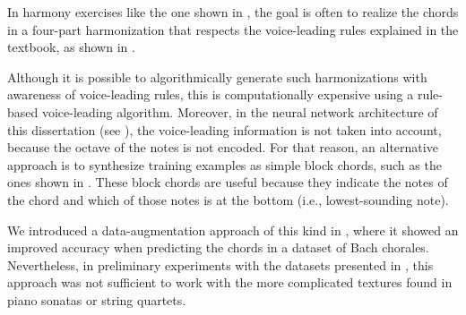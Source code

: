 
In harmony exercises like the one shown in
, the goal is often to
\gls{realize} the chords in a four-part harmonization that
respects the voice-leading rules explained in the textbook,
as shown in . 


Although it is possible to algorithmically generate such
harmonizations with awareness of voice-leading rules, this
is computationally expensive using a rule-based
voice-leading
algorithm.
Moreover, in the neural network architecture of this
dissertation (see ), the voice-leading
information is not taken into account, because the octave of
the notes is not encoded. For that reason, an alternative
approach is to synthesize training examples as simple block
chords, such as the ones shown in
. These block chords are useful
because they indicate the notes of the chord and which of
those notes is at the bottom (i.e., lowest-sounding note). 

We introduced a data-augmentation approach of this kind in
\textcite{napoleslopez2020harmonic}, where it showed an
improved accuracy when predicting the chords in a dataset of
Bach chorales. Nevertheless, in preliminary experiments with
the datasets presented in
, this approach was not
sufficient to work with the more complicated textures found
in piano sonatas or string quartets.

